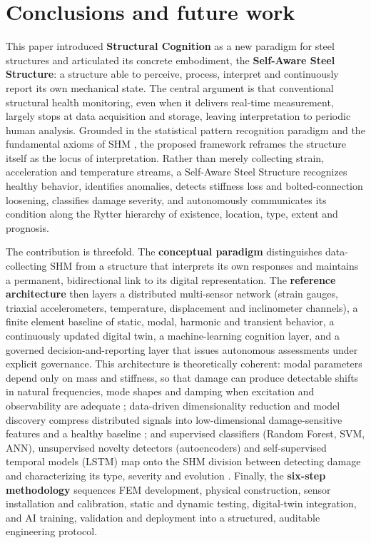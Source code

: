 \section{Conclusions and future work}\label{sec:conclusions}

This paper introduced \textbf{Structural Cognition} as a new paradigm for steel structures and articulated its concrete embodiment, the \textbf{Self-Aware Steel Structure}: a structure able to perceive, process, interpret and continuously report its own mechanical state. The central argument is that conventional structural health monitoring, even when it delivers real-time measurement, largely stops at data acquisition and storage, leaving interpretation to periodic human analysis. Grounded in the statistical pattern recognition paradigm and the fundamental axioms of SHM \citep{farrar2013shm}, the proposed framework reframes the structure itself as the locus of interpretation. Rather than merely collecting strain, acceleration and temperature streams, a Self-Aware Steel Structure recognizes healthy behavior, identifies anomalies, detects stiffness loss and bolted-connection loosening, classifies damage severity, and autonomously communicates its condition along the Rytter hierarchy of existence, location, type, extent and prognosis.

The contribution is threefold. The \textbf{conceptual paradigm} distinguishes data-collecting SHM from a structure that interprets its own responses and maintains a permanent, bidirectional link to its digital representation. The \textbf{reference architecture} then layers a distributed multi-sensor network (strain gauges, triaxial accelerometers, temperature, displacement and inclinometer channels), a finite element baseline of static, modal, harmonic and transient behavior, a continuously updated digital twin, a machine-learning cognition layer, and a governed decision-and-reporting layer that issues autonomous assessments under explicit governance. This architecture is theoretically coherent: modal parameters depend only on mass and stiffness, so that damage can produce detectable shifts in natural frequencies, mode shapes and damping when excitation and observability are adequate \citep{chopra2017dynamics,cook2002fea}; data-driven dimensionality reduction and model discovery compress distributed signals into low-dimensional damage-sensitive features and a healthy baseline \citep{brunton2019data}; and supervised classifiers (Random Forest, SVM, ANN), unsupervised novelty detectors (autoencoders) and self-supervised temporal models (LSTM) map onto the SHM division between detecting damage and characterizing its type, severity and evolution \citep{farrar2013shm,naser2023ml,wangcha2022unsupervised}. Finally, the \textbf{six-step methodology} sequences FEM development, physical construction, sensor installation and calibration, static and dynamic testing, digital-twin integration, and AI training, validation and deployment into a structured, auditable engineering protocol.

